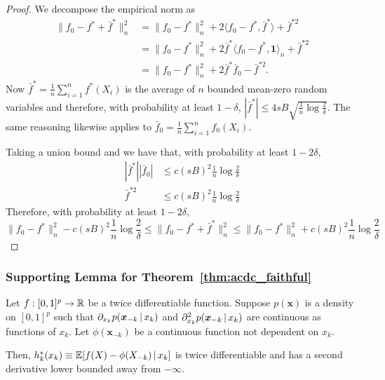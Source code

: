 \begin{proof}
We decompose the empirical norm as
\begin{align*}
\| f_0 - f^* + \bar{f}^* \|_n^2 &= \| f_0 - f^* \|_n^2 
    + 2 \langle f_0 - f^*, \bar{f}^* \rangle + \bar{f}^{*2} \\
  &= \| f_0 - f^* \|_n^2 + 2 \bar{f}^* \langle f_0 - f^*, \mathbf{1} \rangle_n + 
    \bar{f}^{*2} \\
  &= \| f_0 - f^* \|_n^2 + 2 \bar{f}^* \bar{f}_0 - \bar{f}^{*2}.
\end{align*}
Now
$\bar{f}^* = \frac{1}{n} \sum_{i=1}^n f^*(X_i)$ is the average of $n$ bounded mean-zero random variables and therefore, with probability at least $1-\delta$, $| \bar{f}^* | \leq 4 sB \sqrt{ \frac{1}{n} \log \frac{2}{\delta} }$.
The same reasoning likewise applies to $\bar{f}_0 = \frac{1}{n} \sum_{i=1}^n f_0(X_i)$.

Taking a union bound and we have that, with probability at least $1- 2\delta$, 
\begin{align*}
| \bar{f}^* | | \bar{f}_0 | &\leq c (sB)^2 \frac{1}{n} \log \frac{2}{\delta} \\
\bar{f}^{*2} &\leq c (sB)^2 \frac{1}{n} \log \frac{2}{\delta}
\end{align*}
Therefore, with probability at least $1 - 2\delta$,
\[
\|f_0 - f^*\|_n^2 - c (sB)^2 \frac{1}{n} \log \frac{2}{\delta} \leq
    \| f_0 - f^* + \bar{f}^* \|_n^2 \leq 
\|f_0 - f^*\|_n^2 + c (sB)^2 \frac{1}{n} \log \frac{2}{\delta}
\]
\end{proof}





 
\subsubsection{Supporting Lemma for Theorem~\ref{thm:acdc_faithful}}

\begin{lemma}
\label{lem:acdc_derivative_bound}
Let $f : [0,1]^p \rightarrow {\mathbb R}$ be a twice differentiable function. Suppose $p(\mathbf{x})$ is a density on $[0,1]^p$ such that $\partial_{x_k} p(\mbox{\boldmath $x$}_{-k} {\,|\,} x_k)$ and $\partial_{x_k}^2 p(\mbox{\boldmath $x$}_{-k} {\,|\,} x_k)$ are continuous as functions of $x_k$. Let $\phi(\mathbf{x}_{-k})$ be a continuous function not dependent on $x_k$.

Then, $h^*_k(x_k) \equiv {\mathbb E}[ f(X) - \phi(X_{-k}) {\,|\,} x_k]$ is twice
differentiable and has a second derivative lower 
bounded away from $-\infty$.
\end{lemma}

